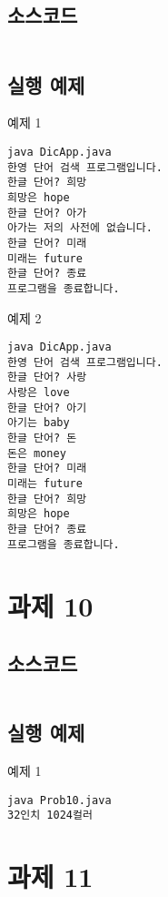 \documentclass{article}
\theoremstyle{nonumberplain}
\begin{document}
\subsection{소스코드}
\begin{code}
\inputminted{java}{java/Prob9/DicApp.java}
\end{code}
\subsection{실행 예제}
예제 1
\begin{code}
\begin{verbatim}
java DicApp.java
한영 단어 검색 프로그램입니다.
한글 단어? 희망
희망은 hope
한글 단어? 아가
아가는 저의 사전에 없습니다.
한글 단어? 미래
미래는 future
한글 단어? 종료
프로그램을 종료합니다.
\end{verbatim}
\end{code}
예제 2
\begin{code}
\begin{verbatim}
java DicApp.java
한영 단어 검색 프로그램입니다.
한글 단어? 사랑
사랑은 love
한글 단어? 아기
아기는 baby
한글 단어? 돈
돈은 money
한글 단어? 미래
미래는 future
한글 단어? 희망
희망은 hope
한글 단어? 종료
프로그램을 종료합니다.
\end{verbatim}
\end{code}



\section{과제 10}
\subsection{소스코드}
\begin{code}
\inputminted{java}{java/Prob10.java}
\end{code}
\subsection{실행 예제}
예제 1
\begin{code}
\begin{verbatim}
java Prob10.java
32인치 1024컬러
\end{verbatim}
\end{code}



\section{과제 11}
\end{document}
